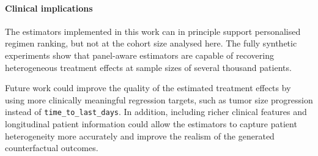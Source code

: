 \documentclass{article}
\begin{document}
\paragraph{Clinical implications}
The estimators implemented in this work can in principle support
personalised regimen ranking, but not at the cohort size analysed here.
The fully synthetic experiments show that panel-aware estimators are
capable of recovering heterogeneous treatment effects at sample sizes
of several thousand patients.

Future work could improve the quality of the estimated treatment
effects by using more clinically meaningful regression targets, such
as tumor size progression instead of \texttt{time\_to\_last\_days}. In addition,
including richer clinical features and longitudinal patient information
could allow the estimators to capture patient heterogeneity more
accurately and improve the realism of the generated counterfactual
outcomes.



\end{document}
